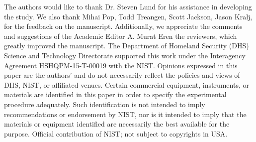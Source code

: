 \documentclass[fleqn,10pt,lineno]{wlpeerj}\usepackage[]{graphicx}\usepackage[]{color}
\begin{document}
The authors would like to thank Dr. Steven Lund for his assistance in developing the study. 
We also thank Mihai Pop, Todd Treangen, Scott Jackson, Jason Kralj, for the feedback on the manuscript. 
Additionally, we appreciate the comments and suggestions of the Academic Editor A. Murat Eren the reviewers, which greatly improved the manuscript.
The Department of Homeland Security (DHS) Science and Technology Directorate supported this work under the Interagency Agreement HSHQPM-15-T-00019 with the NIST.
Opinions expressed in this paper are the authors’ and do not necessarily reflect the policies and views of DHS,  NIST, or affiliated venues.
Certain commercial equipment, instruments, or materials are identified in this paper in order to specify the experimental procedure adequately.
Such identification is not intended to imply recommendations or endorsement by NIST,
nor is it intended to imply that the materials or equipment identified are necessarily the best available for the purpose.
Official contribution of NIST; not subject to copyrights in USA.


\end{document}
